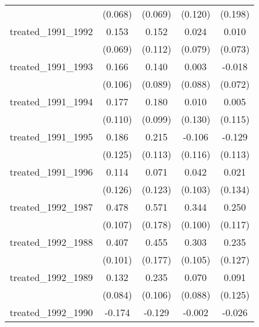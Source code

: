 {\begin{tabular}{l*{4}{c}}
            &     (0.068)         &     (0.069)         &     (0.120)         &     (0.198)         \\
[1em]
treated\_1991\_1992&       0.153\sym{*}  &       0.152         &       0.024         &       0.010         \\
            &     (0.069)         &     (0.112)         &     (0.079)         &     (0.073)         \\
[1em]
treated\_1991\_1993&       0.166         &       0.140         &       0.003         &      -0.018         \\
            &     (0.106)         &     (0.089)         &     (0.088)         &     (0.072)         \\
[1em]
treated\_1991\_1994&       0.177         &       0.180         &       0.010         &       0.005         \\
            &     (0.110)         &     (0.099)         &     (0.130)         &     (0.115)         \\
[1em]
treated\_1991\_1995&       0.186         &       0.215         &      -0.106         &      -0.129         \\
            &     (0.125)         &     (0.113)         &     (0.116)         &     (0.113)         \\
[1em]
treated\_1991\_1996&       0.114         &       0.071         &       0.042         &       0.021         \\
            &     (0.126)         &     (0.123)         &     (0.103)         &     (0.134)         \\
[1em]
treated\_1992\_1987&       0.478\sym{***}&       0.571\sym{**} &       0.344\sym{***}&       0.250\sym{*}  \\
            &     (0.107)         &     (0.178)         &     (0.100)         &     (0.117)         \\
[1em]
treated\_1992\_1988&       0.407\sym{***}&       0.455\sym{*}  &       0.303\sym{**} &       0.235         \\
            &     (0.101)         &     (0.177)         &     (0.105)         &     (0.127)         \\
[1em]
treated\_1992\_1989&       0.132         &       0.235\sym{*}  &       0.070         &       0.091         \\
            &     (0.084)         &     (0.106)         &     (0.088)         &     (0.125)         \\
[1em]
treated\_1992\_1990&      -0.174         &      -0.129         &      -0.002         &      -0.026         \\

\end{tabular}}

